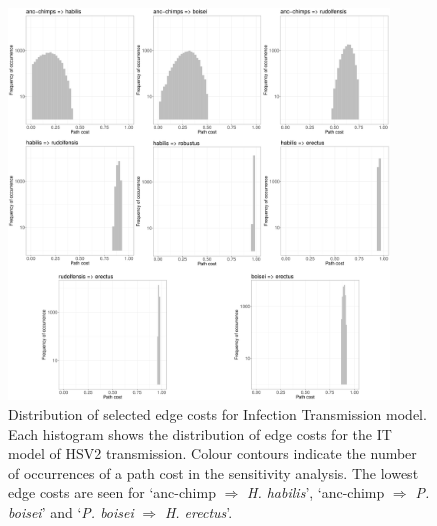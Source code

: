 \documentclass[fleqn,10pt]{wlscirep}
\begin{document}
\begin{figure}[!htbp]
  \centering
  \includegraphics[width=0.9\textwidth]{figs/gamma_individual_path_costs}
  \caption{ Distribution of selected edge costs for Infection Transmission model. 
Each histogram shows the distribution of edge costs for the IT model of HSV2 transmission. Colour contours indicate the number of occurrences of a path cost in the sensitivity analysis. The lowest edge costs are seen for ‘anc-chimp $\Rightarrow$ \textit{H. habilis}’, ‘anc-chimp $\Rightarrow$ \textit{P. boisei}’ and ‘\textit{P. boisei} $\Rightarrow$ \textit{H. erectus}’.}
  \label{fig:gamma-paths}   
\end{figure}     
\end{document}
